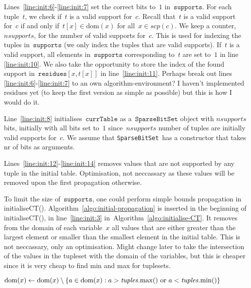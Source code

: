 \documentclass[a4paper,11pt]{article}
\newcommand{\Todo}[1]{{\color{blue}#1}}
\newcommand{\Algoref}[1]{Algorithm~\ref{#1}}
\newcommand{\Lineref}[1]{Line~\ref{#1}}
\newcommand{\Linesref}[2]{Lines~\ref{#1}-\ref{#2}}
\newcommand{\Dom}[1]{\text{dom}({#1})}
\newcommand{\SparseBitSet}{\texttt{SparseBitSet}}
\newcommand{\CurrTable}{\texttt{currTable}}
\newcommand{\Supports}{\texttt{supports}}
\newcommand{\Residues}{\texttt{residues}}
\newcommand{\FOREACH}[1]{\WHILE{{#1} \textbf{do}}}
\newcommand{\ENDFOREACH}{\ENDWHILE}
\newcommand{\function}[1]{\mathrm{#1}}
\newcommand{\localvar}[1]{\mathit{#1}}
\numberwithin{equation}{section}
\begin{document}
\Linesref{line:init:6}{line:init:7} set the correct bits to~$1$ in~$\Supports$.
For each tuple~$t$, we check if~$t$ is a valid support for~$c$. Recall that~$t$ is
a valid support for~$c$ if and only if~$t[x] \in \Dom{x}$ for all~$x \in scp(c)$.
We keep a counter,~$nsupports$, for the number of valid supports for~$c$.
This is used for indexing the tuples in~$\Supports$ (we only index the tuples
that are valid supports).
If~$t$ is a valid support,
all elements in~$\Supports$ corresponding to~$t$ are set to~$1$ in
line \ref{line:init:10}. We also take the opportunity to store the index
of the found support in~$\Residues[x,t[x]]$
in line~\ref{line:init:11}.
\Todo{Perhaps break out lines \ref{line:init:6}-\ref{line:init:7} to an own algorithm-environment?
I haven't implemented residues yet (to keep the first version as simple as possible)
but this is how I would do it.}

\Lineref{line:init:8} initialises~$\CurrTable$ as a~$\SparseBitSet$ object with
$nsupports$ bits, initially with all bits set to~$1$ since~$nsupports$
number of tuples are initially valid supports for~$c$. \Todo{We assume that 
\SparseBitSet~has a constructor that takes nr of bits as arguments.}

\Linesref{line:init:12}{line:init:14} removes values that are not supported
by any tuple in the initial table. \Todo{Optimisation, not neccassary
  as these values will be removed upon the first propagation otherwise.}

 
  To limit the size of~$\Supports$, one could perform simple bounds
  propagation in initialiseCT(). \Algoref{algo:initial-propagation}
  is inserted in the beginning of initialiseCT(), in line~\ref{line:init:3}
  in~\Algoref{algo:initialise-CT}. It removes
  from the domain of each variable~$x$ all values that are either greater 
  than the largest element or smaller than the smallest element in the
  initial table. \Todo{This is not neccassary, only an optimisation.
  Might change later to take the intersection of the 
  values in the tupleset with the domain of the variables, but this is cheaper
  since it is very cheap to find min and max for tuplesets.}

\begin{algorithm}[H]
  \begin{algorithmic}[1]  %
    \FOREACH{$x \in \localvar{variables}$} %
        \STATE $\Dom{x} \leftarrow \Dom{x} \setminus  
        \Set{a \in \Dom{x} : a > \localvar{tuples}.\function{max}()
          ~\text{or}~a < \localvar{tuples}.\function{min}()}$
      \ENDFOREACH
  \end{algorithmic}
  \caption{Simple initial propagation for keeping down the size of \Supports,
  to be inserted in the beginning of initialiseCT() in~\Algoref{algo:initialise-CT}.}
  \label{algo:initial-propagation}
\end{algorithm}
\end{document}
